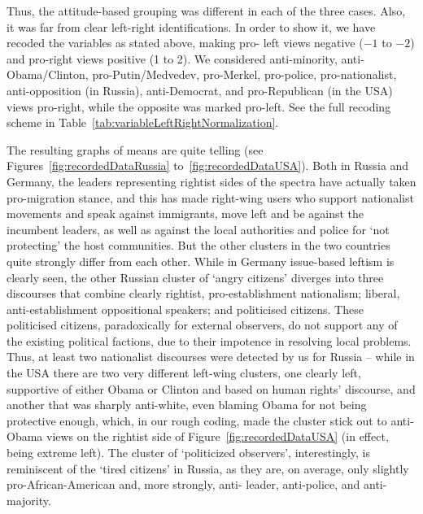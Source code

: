 Thus, the attitude-based grouping was different in each of the three cases. Also, it was far from clear left-right identifications. In order to show it, we have recoded the variables as stated above, making pro- left views negative (\(-1\) to \(-2\)) and pro-right views positive (1 to 2). We considered anti-minority, anti-Obama/Clinton, pro-Putin/Medvedev, pro-Merkel, pro-police, pro-nationalist, anti-opposition (in Russia), anti-Democrat, and pro-Republican (in the USA) views pro-right, while the opposite was marked pro-left. See the full recoding scheme in Table~\cref{tab:variableLeftRightNormalization}.

The resulting graphs of means are quite telling (see Figures~\cref{fig:recordedDataRussia} to~\cref{fig:recordedDataUSA}). Both in Russia and Germany, the leaders representing rightist sides of the spectra have actually taken pro-migration stance, and this has made right-wing users who support nationalist movements and speak against immigrants, move left and be against the incumbent leaders, as well as against the local authorities and police for ‘not protecting’ the host communities. But the other clusters in the two countries quite strongly differ from each other. While in Germany issue-based leftism is clearly seen, the other Russian cluster of ‘angry citizens’ diverges into three discourses that combine clearly rightist, pro-establishment nationalism; liberal, anti-establishment oppositional speakers; and politicised citizens. These politicised citizens, paradoxically for external observers, do not support any of the existing political factions, due to their impotence in resolving local problems. Thus, at least two nationalist discourses were detected by us for Russia -- while in the USA there are two very different left-wing clusters, one clearly left, supportive of either Obama or Clinton and based on human rights’ discourse, and another that was sharply anti-white, even blaming Obama for not being protective enough, which, in our rough coding, made the cluster stick out to anti-Obama views on the rightist side of Figure~\cref{fig:recordedDataUSA} (in effect, being extreme left). The cluster of ‘politicized observers’, interestingly, is reminiscent of the ‘tired citizens’ in Russia, as they are, on average, only slightly pro-African-American and, more strongly, anti- leader, anti-police, and anti-majority.

